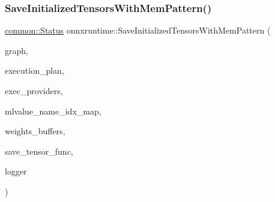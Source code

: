 \mbox{\label{namespaceonnxruntime_ad7943db98c4dc8d2bfbe46f4ecfbb874}} 
\subsubsection{\texorpdfstring{Save\+Initialized\+Tensors\+With\+Mem\+Pattern()}{SaveInitializedTensorsWithMemPattern()}}
{\footnotesize\ttfamily \mbox{\hyperlink{classonnxruntime_1_1common_1_1Status}{common\+::\+Status}} onnxruntime\+::\+Save\+Initialized\+Tensors\+With\+Mem\+Pattern (\begin{DoxyParamCaption}\item[{const \mbox{\hyperlink{classonnxruntime_1_1Graph}{Graph}} \&}]{graph,  }\item[{const \mbox{\hyperlink{structonnxruntime_1_1SequentialExecutionPlan}{Sequential\+Execution\+Plan}} \&}]{execution\+\_\+plan,  }\item[{const \mbox{\hyperlink{classonnxruntime_1_1ExecutionProviders}{Execution\+Providers}} \&}]{exec\+\_\+providers,  }\item[{const \mbox{\hyperlink{classonnxruntime_1_1MLValueNameIdxMap}{M\+L\+Value\+Name\+Idx\+Map}} \&}]{mlvalue\+\_\+name\+\_\+idx\+\_\+map,  }\item[{std\+::map$<$ \mbox{\hyperlink{structONNXRuntimeAllocatorInfo}{O\+N\+N\+X\+Runtime\+Allocator\+Info}}, \mbox{\hyperlink{namespaceonnxruntime_acd830c816d6e0699b671f8ba79bb48f9}{Buffer\+Unique\+Ptr}} $>$ \&}]{weights\+\_\+buffers,  }\item[{const \mbox{\hyperlink{namespaceonnxruntime_a5fae67d87ce801a6093492d9af44a5bc}{Save\+Tensor\+Func}} \&}]{save\+\_\+tensor\+\_\+func,  }\item[{const \mbox{\hyperlink{classonnxruntime_1_1logging_1_1Logger}{logging\+::\+Logger}} \&}]{logger }\end{DoxyParamCaption})}

\mbox{\label{namespaceonnxruntime_ac10ac6d7290c51ba8c501fa53a835255}} 
